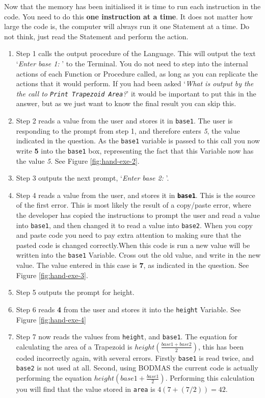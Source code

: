 Now that the memory has been initialised it is time to run each instruction in the code. You need to do this \textbf{one instruction at a time}. It does not matter how large the code is, the computer will always run it one Statement at a time. Do not think, just read the Statement and perform the action.

\begin{enumerate}
  \item Step 1 calls the output procedure of the Language. This will output the text `\emph{Enter base 1: }' to the Terminal. You do not need to step into the internal actions of each Function or Procedure called, as long as you can replicate the actions that it would perform. If you had been asked `\emph{What is output by the the call to \texttt{Print Trapezoid Area}?}' it would be important to put this in the answer, but as we just want to know the final result you can skip this.
  \item Step 2 reads a value from the user and stores it in \texttt{base1}. The user is responding to the prompt from step 1, and therefore enters \emph{5}, the value indicated in the question. As the \texttt{base1} variable is passed to this call you now write \textbf{5} into the \texttt{base1} box, representing the fact that this Variable now has the value \emph{5}. See Figure \ref{fig:hand-exe-2}.
  \item Step 3 outputs the next prompt, `\emph{Enter base 2: }'.
  \item Step 4 reads a value from the user, and stores it in \textbf{\texttt{base1}}. This is the source of the first error. This is most likely the result of a copy/paste error, where the developer has copied the instructions to prompt the user and read a value into \texttt{base1}, and then changed it to read a value into \texttt{base2}. When you copy and paste code you need to pay extra attention to making sure that the pasted code is changed correctly.\newline\newline When this code is run a new value will be written into the \texttt{base1} Variable. Cross out the old value, and write in the new value. The value entered in this case is \textbf{7}, as indicated in the question. See Figure \ref{fig:hand-exe-3}.
  \item Step 5 outputs the prompt for height.
  \item Step 6 reads \textbf{4} from the user and stores it into the \texttt{height} Variable. See Figure \ref{fig:hand-exe-4}
  \item Step 7 now reads the values from \texttt{height}, and \texttt{base1}. The equation for calculating the area of a Trapezoid is $ height ( \frac{base 1 + base 2}{2} ) $, this has been coded incorrectly again, with several errors. Firstly \texttt{base1} is read twice, and \texttt{base2} is not used at all. Second, using BODMAS the current code is actually performing the equation $ height (base 1 + \frac{base 1}{2})$. Performing this calculation you will find that the value stored in \texttt{area} is $ 4 ( 7 + (7 / 2)) = 42$.

\end{enumerate}
